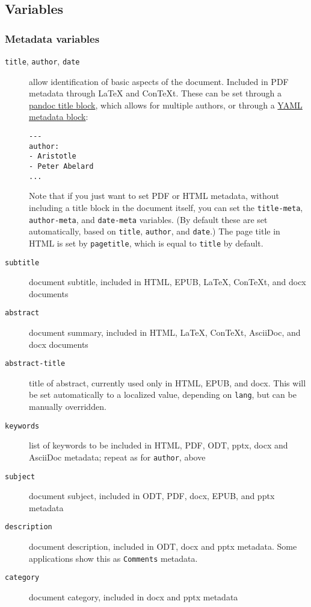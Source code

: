 \documentclass[
  a4paper,
]{article}
\begin{document}
\hypertarget{variables}{%
\subsection{Variables}\label{variables}}

\hypertarget{metadata-variables}{%
\subsubsection{Metadata variables}\label{metadata-variables}}

\begin{description}
\item[\texttt{title}, \texttt{author}, \texttt{date}]
allow identification of basic aspects of the document. Included in PDF
metadata through LaTeX and ConTeXt. These can be set through a
\protect\hyperlink{extension-pandoc_title_block}{pandoc title block},
which allows for multiple authors, or through a
\protect\hyperlink{extension-yaml_metadata_block}{YAML metadata block}:

\begin{verbatim}
---
author:
- Aristotle
- Peter Abelard
...
\end{verbatim}

Note that if you just want to set PDF or HTML metadata, without
including a title block in the document itself, you can set the
\texttt{title-meta}, \texttt{author-meta}, and \texttt{date-meta}
variables. (By default these are set automatically, based on
\texttt{title}, \texttt{author}, and \texttt{date}.) The page title in
HTML is set by \texttt{pagetitle}, which is equal to \texttt{title} by
default.
\item[\texttt{subtitle}]
document subtitle, included in HTML, EPUB, LaTeX, ConTeXt, and docx
documents
\item[\texttt{abstract}]
document summary, included in HTML, LaTeX, ConTeXt, AsciiDoc, and docx
documents
\item[\texttt{abstract-title}]
title of abstract, currently used only in HTML, EPUB, and docx. This
will be set automatically to a localized value, depending on
\texttt{lang}, but can be manually overridden.
\item[\texttt{keywords}]
list of keywords to be included in HTML, PDF, ODT, pptx, docx and
AsciiDoc metadata; repeat as for \texttt{author}, above
\item[\texttt{subject}]
document subject, included in ODT, PDF, docx, EPUB, and pptx metadata
\item[\texttt{description}]
document description, included in ODT, docx and pptx metadata. Some
applications show this as \texttt{Comments} metadata.
\item[\texttt{category}]
document category, included in docx and pptx metadata
\end{description}
\end{document}
